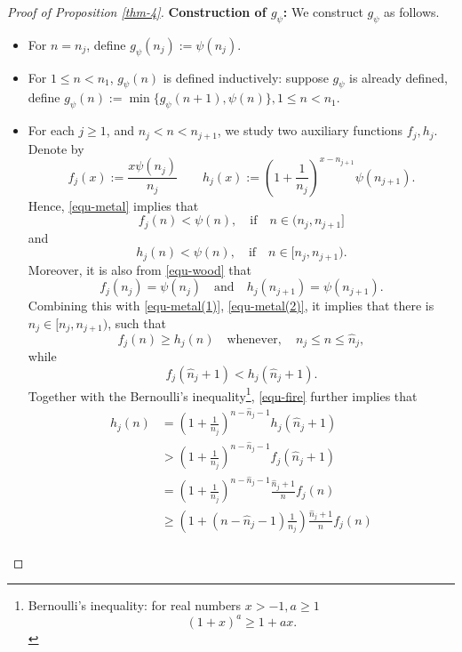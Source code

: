 \documentclass[12pt,reqno]{amsart}
\renewcommand{\=}{\coloneqq}
\theoremstyle{plain}
\begin{document}
\begin{proof}[Proof of Proposition \ref{thm-4}]
\textbf{Construction of $g_{\psi}$:} We construct $g_{\psi}$ as follows.
\begin{itemize}
\item For $n=n_j$, define $g_\psi(n_j):= \psi(n_j)$.
\item For $1\leq n<n_1$, $g_\psi(n)$ is defined inductively: suppose $g_{\psi}$ is already defined, define $g_\psi(n):= \min\{g_\psi(n+1),\psi(n)\}, 1\leq n < n_1$.
\item For each $j\geq 1$, and $n_{j}<n<n_{j+1}$, we study two auxiliary functions $f_j, h_j$. Denote by
\begin{equation}\label{equ-wood}
f_j(x):= \frac{x\psi(n_j)}{n_j} \quad \quad h_j(x):= \left(1+\frac{1}{n_j}\right)^{x-n_{j+1}} \psi(n_{j+1}).
\end{equation}
Hence, \eqref{equ-metal} implies that				
\begin{equation}\label{equ-metal(1)}
f_j(n) < \psi(n), \quad \mbox{if} \quad n\in (n_j, n_{j+1}]
\end{equation}
and
\begin{equation}\label{equ-metal(2)}
h_j(n) < \psi(n), \quad \mbox{if} \quad n\in [n_j, n_{j+1}).
\end{equation}
Moreover, it is also from \eqref{equ-wood} that
$$
f_j(n_j) = \psi(n_j) \quad\mbox{and}\quad h_j(n_{j+1}) = \psi(n_{j+1}).
$$
Combining this with \eqref{equ-metal(1)}, \eqref{equ-metal(2)}, it implies that there is $\hat{n}_j \in [n_j, n_{j+1})$, such that
\begin{equation}\label{equ-water}
f_j(n)\geq h_j(n) \quad \mbox{whenever}, \quad n_j \leq n\leq \hat{n}_j,
\end{equation}
while
\begin{equation}\label{equ-fire}
f_j(\hat{n}_j + 1) < h_j(\hat{n}_j + 1).
\end{equation}
Together with the Bernoulli's inequality\footnote{Bernoulli's inequality: for real numbers $x>-1, a\geq 1$
        \begin{equation}\label{e.Bernoulli's}
            (1+x)^a\geq 1+ax.
        \end{equation}
        },  \eqref{equ-fire} further implies that
\begin{align*}
   h_j(n)
   &=(1+\frac{1}{n_j})^{n-\hat{n}_j-1}h_j(\hat{n}_j+1)\\
   &>(1+\frac{1}{n_j})^{n-\hat{n}_j-1}f_j(\hat{n}_j+1)\\
   &=(1+\frac{1}{n_j})^{n-\hat{n}_j-1}\frac{\hat{n}_j+1}{n}f_j(n)\\
   &\geq (1+(n-\hat{n}_j-1)\frac{1}{n_j})\frac{\hat{n}_j+1}{n}f_j(n)\\

\end{align*}
\end{itemize}
\end{proof}
\end{document}
